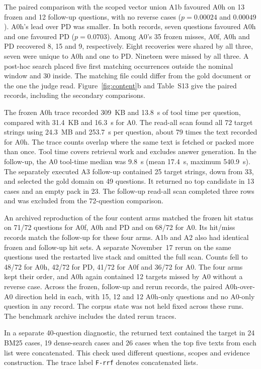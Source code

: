 The paired comparison with the scoped vector union A1b favoured A0h on
13 frozen and 12 follow-up questions, with no reverse cases
($p=0.00024$ and $0.00049$). A0h's lead over PD was smaller. In both
records, seven questions favoured A0h and one favoured PD
($p=0.0703$). Among A0's 35 frozen misses, A0f, A0h and PD recovered
8, 15 and 9, respectively. Eight recoveries were shared by all three,
seven were unique to A0h and one to PD. Nineteen were missed by all three.
A post-hoc search placed five first matching occurrences outside the
nominal window and 30 inside. The matching file could differ from the gold
document or the one the judge read. Figure~\ref{fig:content}b and Table~S13
give the paired records, including the secondary comparisons.

The frozen A0h trace recorded 309~KB and 13.8~s of tool time per question, compared with
31.4~KB and 16.3~s for A0. The read-all scan found all 72 target strings
using 24.3~MB and 253.7~s per question, about 79 times the text recorded
for A0h. The trace counts overlap where the same text is fetched or packed
more than once. Tool time covers retrieval work and excludes answer
generation. In the follow-up, the A0 tool-time median was 9.8~s
(mean 17.4~s, maximum 540.9~s). The separately executed A3 follow-up
contained 25 target strings, down from 33, and selected the gold domain
on 49 questions. It returned no top candidate in 13 cases and an empty
pack in 23. The follow-up read-all scan completed three rows and was
excluded from the 72-question comparison.

An archived reproduction of the four content arms matched the frozen
hit status on 71/72 questions for A0f, A0h and PD and on 68/72 for A0.
Its hit/miss records match the follow-up for these four arms. A1b and A2
also had identical frozen and follow-up hit sets. A separate November~17
rerun on the same questions used the restarted live stack and omitted the
full scan. Counts fell to 48/72 for A0h, 42/72 for PD, 41/72 for A0f
and 36/72 for A0. The four arms kept their order, and A0h again contained
12 targets missed by A0 without a reverse case. Across the frozen,
follow-up and rerun records, the paired A0h-over-A0 direction held in
each, with 15, 12 and 12 A0h-only questions and no A0-only question in
any record. The corpus state was not
held fixed across these runs. The benchmark archive includes the dated
rerun traces.

In a separate 40-question diagnostic, the returned text contained the target
in 24 BM25 cases, 19 dense-search cases and 26 cases when the top five
texts from each list were concatenated. This check used different
questions, scopes and evidence construction. The trace label
\texttt{F-rrf} denotes concatenated lists.

